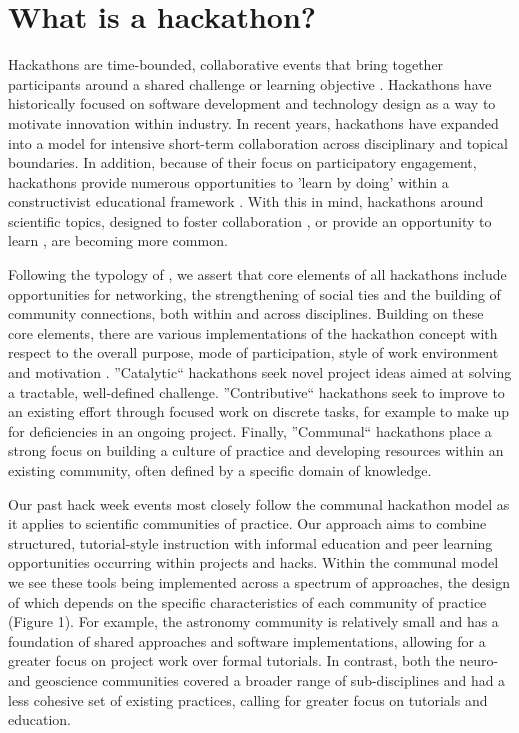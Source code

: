 \section*{What is a hackathon?}

Hackathons are time-bounded, collaborative events that bring together participants around a shared challenge or learning objective \cite{Decker2015}.
Hackathons have historically focused on software development and technology design as a way to motivate innovation within industry.
In recent years, hackathons have expanded into a model for intensive short-term collaboration across disciplinary and topical boundaries.
In addition, because of their focus on participatory engagement, hackathons provide numerous opportunities to 'learn by doing' within a constructivist educational framework \cite{Bransford2000-lu,Papert1980-fh}.
With this in mind, hackathons around scientific topics, designed to foster collaboration \cite{Groen2015-cj,Moller2013-ah}, or provide an opportunity to learn \cite{Kienzler2015-zu,Lamers2014-xf}, are becoming more common.

Following the typology of \cite{Drouhard2017}, we assert that core elements of all hackathons include opportunities for networking, the strengthening of social ties and the building of community connections, both within and across disciplines.
Building on these core elements, there are various implementations of the hackathon concept with respect to the overall purpose, mode of participation, style of work environment and motivation \cite{Drouhard2017}.
''Catalytic`` hackathons seek novel project ideas aimed at solving a tractable, well-defined challenge.
''Contributive`` hackathons seek to improve to an existing effort through focused work on discrete tasks, for example to make up for deficiencies in an ongoing project.
Finally, ''Communal`` hackathons place a strong focus on building a culture of practice and developing resources within an existing community, often defined by a specific domain of knowledge.

Our past hack week events most closely follow the communal hackathon model as it applies to scientific communities of practice.
Our approach aims to combine structured, tutorial-style instruction with informal education and peer learning opportunities occurring within projects and hacks.
Within the communal model we see these tools being implemented across a spectrum of approaches, the design of which depends on the specific characteristics of each community of practice (Figure 1).
For example, the astronomy community is relatively small and has a foundation of shared approaches and software implementations, allowing for a greater focus on project work over formal tutorials.
In contrast, both the neuro- and geoscience communities covered a broader range of sub-disciplines and had a less cohesive set of existing practices, calling for greater focus on tutorials and education.

